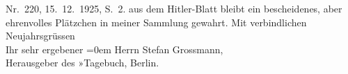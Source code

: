 \begin{ledgroupsized}[t]{13cm}
{{{                     Nr. 220, 15. 12. 1925, S. 2.}}}\label{K_L02459-2h} aus dem Hitler-Blatt bleibt ein bescheidenes, aber ehrenvolles Plätzchen
               in meiner Sammlung gewahrt.\pend
           \pstart
           Mit verbindlichen Neujahrsgrüssen{\\[\baselineskip]}Ihr sehr ergebener\pend
           \leftskip=0em{}{\bigskip}\pstart
           \noindent{}Herrn Stefan Grossmann,{\\}Herausgeber des »Tagebuch\label{T_L02459-1v}\label{T_L02459-1h}, Berlin.\pend
           
         
         \endnumbering{}\end{ledgroupsized}  \newcommand{\dateiname}{L02459}\newcommand{\titel}{Arthur Schnitzler an Stefan Großmann, 24. 12. 1925}\newcommand{\editorInnen}{Martin Anton Müller und Gerd-Hermann Susen}
      